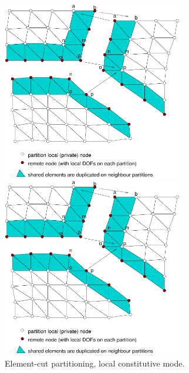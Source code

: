 \documentclass[a4paper]{article}
\begin{document}
\begin{figure}[htb]
\begin{htmlonly}
  \centerline{\includegraphics[width=0.7\textwidth]{elementcut1}}
\end{htmlonly}
\centerline{\includegraphics[width=0.7\textwidth]{elementcut1}}
\caption{Element-cut partitioning, local constitutive mode.}
\label{elmentcut-lm}
\end{figure}
\end{document}
